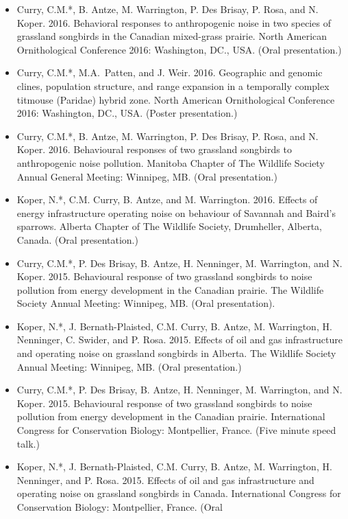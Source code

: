 \documentclass[
  letterpaper,
  DIV=11,
  numbers=noendperiod,
  oneside]{scrreprt}
\begin{document}
\begin{itemize}
\item
  Curry, C.M.*, B. Antze, M. Warrington, P. Des Brisay, P. Rosa, and N.
  Koper. 2016. Behavioral responses to anthropogenic noise in two
  species of grassland songbirds in the Canadian mixed-grass prairie.
  North American Ornithological Conference 2016: Washington, DC., USA.
  (Oral presentation.)
\item
  Curry, C.M.*, M.A.~Patten, and J. Weir. 2016. Geographic and genomic
  clines, population structure, and range expansion in a temporally
  complex titmouse (Paridae) hybrid zone. North American Ornithological
  Conference 2016: Washington, DC., USA. (Poster presentation.)
\item
  Curry, C.M.*, B. Antze, M. Warrington, P. Des Brisay, P. Rosa, and N.
  Koper. 2016. Behavioural responses of two grassland songbirds to
  anthropogenic noise pollution. Manitoba Chapter of The Wildlife
  Society Annual General Meeting: Winnipeg, MB. (Oral presentation.)
\item
  Koper, N.*, C.M. Curry, B. Antze, and M. Warrington. 2016. Effects of
  energy infrastructure operating noise on behaviour of Savannah and
  Baird's sparrows. Alberta Chapter of The Wildlife Society, Drumheller,
  Alberta, Canada. (Oral presentation.)
\item
  Curry, C.M.*, P. Des Brisay, B. Antze, H. Nenninger, M. Warrington,
  and N. Koper. 2015. Behavioural response of two grassland songbirds to
  noise pollution from energy development in the Canadian prairie. The
  Wildlife Society Annual Meeting: Winnipeg, MB. (Oral presentation).
\item
  Koper, N.*, J. Bernath-Plaisted, C.M. Curry, B. Antze, M. Warrington,
  H. Nenninger, C. Swider, and P. Rosa. 2015. Effects of oil and gas
  infrastructure and operating noise on grassland songbirds in Alberta.
  The Wildlife Society Annual Meeting: Winnipeg, MB. (Oral
  presentation.)
\item
  Curry, C.M.*, P. Des Brisay, B. Antze, H. Nenninger, M. Warrington,
  and N. Koper. 2015. Behavioural response of two grassland songbirds to
  noise pollution from energy development in the Canadian prairie.
  International Congress for Conservation Biology: Montpellier, France.
  (Five minute speed talk.)
\item
  Koper, N.*, J. Bernath-Plaisted, C.M. Curry, B. Antze, M. Warrington,
  H. Nenninger, and P. Rosa. 2015. Effects of oil and gas infrastructure
  and operating noise on grassland songbirds in Canada. International
  Congress for Conservation Biology: Montpellier, France. (Oral

\end{itemize}
\end{document}
